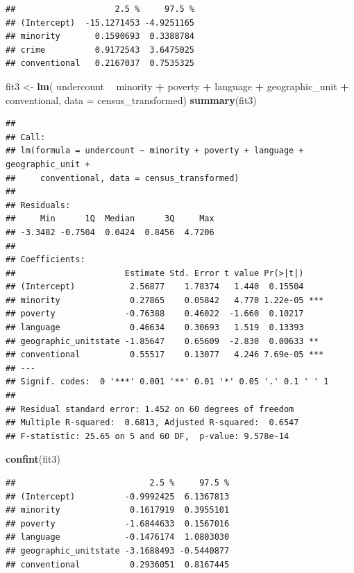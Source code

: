 \documentclass[landscape]{article}
\newenvironment{Shaded}{\begin{snugshade}}{\end{snugshade}}
\newcommand{\KeywordTok}[1]{\textcolor[rgb]{0.13,0.29,0.53}{\textbf{#1}}}
\newcommand{\DataTypeTok}[1]{\textcolor[rgb]{0.13,0.29,0.53}{#1}}
\newcommand{\StringTok}[1]{\textcolor[rgb]{0.31,0.60,0.02}{#1}}
\newcommand{\OperatorTok}[1]{\textcolor[rgb]{0.81,0.36,0.00}{\textbf{#1}}}
\newcommand{\NormalTok}[1]{#1}
\begin{document}
\begin{verbatim}
##                    2.5 %     97.5 %
## (Intercept)  -15.1271453 -4.9251165
## minority       0.1590693  0.3388784
## crime          0.9172543  3.6475025
## conventional   0.2167037  0.7535325
\end{verbatim}

\newpage

\begin{Shaded}
\begin{Highlighting}[]
\NormalTok{fit3 <-}\StringTok{ }\KeywordTok{lm}\NormalTok{(}
\NormalTok{  undercount }\OperatorTok{~}\StringTok{ }\NormalTok{minority }\OperatorTok{+}\StringTok{ }\NormalTok{poverty }\OperatorTok{+}\StringTok{ }\NormalTok{language }\OperatorTok{+}\StringTok{ }\NormalTok{geographic_unit }\OperatorTok{+}\StringTok{ }\NormalTok{conventional,}
  \DataTypeTok{data =}\NormalTok{ census_transformed)}
\KeywordTok{summary}\NormalTok{(fit3)}
\end{Highlighting}
\end{Shaded}

\begin{verbatim}
## 
## Call:
## lm(formula = undercount ~ minority + poverty + language + geographic_unit + 
##     conventional, data = census_transformed)
## 
## Residuals:
##     Min      1Q  Median      3Q     Max 
## -3.3482 -0.7504  0.0424  0.8456  4.7206 
## 
## Coefficients:
##                      Estimate Std. Error t value Pr(>|t|)    
## (Intercept)           2.56877    1.78374   1.440  0.15504    
## minority              0.27865    0.05842   4.770 1.22e-05 ***
## poverty              -0.76388    0.46022  -1.660  0.10217    
## language              0.46634    0.30693   1.519  0.13393    
## geographic_unitstate -1.85647    0.65609  -2.830  0.00633 ** 
## conventional          0.55517    0.13077   4.246 7.69e-05 ***
## ---
## Signif. codes:  0 '***' 0.001 '**' 0.01 '*' 0.05 '.' 0.1 ' ' 1
## 
## Residual standard error: 1.452 on 60 degrees of freedom
## Multiple R-squared:  0.6813, Adjusted R-squared:  0.6547 
## F-statistic: 25.65 on 5 and 60 DF,  p-value: 9.578e-14
\end{verbatim}

\begin{Shaded}
\begin{Highlighting}[]
\KeywordTok{confint}\NormalTok{(fit3)}
\end{Highlighting}
\end{Shaded}

\begin{verbatim}
##                           2.5 %     97.5 %
## (Intercept)          -0.9992425  6.1367813
## minority              0.1617919  0.3955101
## poverty              -1.6844633  0.1567016
## language             -0.1476174  1.0803030
## geographic_unitstate -3.1688493 -0.5440877
## conventional          0.2936051  0.8167445
\end{verbatim}
\end{document}
